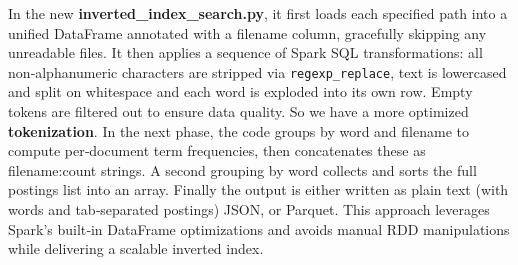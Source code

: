 In the new \textbf{inverted\_index\_search.py}, it first loads each specified path into a unified DataFrame annotated with a filename column, gracefully skipping any unreadable files. It then applies a sequence of Spark SQL transformations: all non‐alphanumeric characters are stripped via \texttt{regexp\_replace}, text is lowercased and split on whitespace and each word is exploded into its own row. Empty tokens are filtered out to ensure data quality. So we have a more optimized \textbf{tokenization}. In the next phase, the code groups by word and filename to compute per‐document term frequencies, then concatenates these as filename:count strings. A second grouping by word collects and sorts the full postings list into an array. Finally the output is either written as plain text (with words and tab‐separated postings) JSON, or Parquet. This approach leverages Spark’s built‐in DataFrame optimizations and avoids manual RDD manipulations while delivering a scalable inverted index. 



